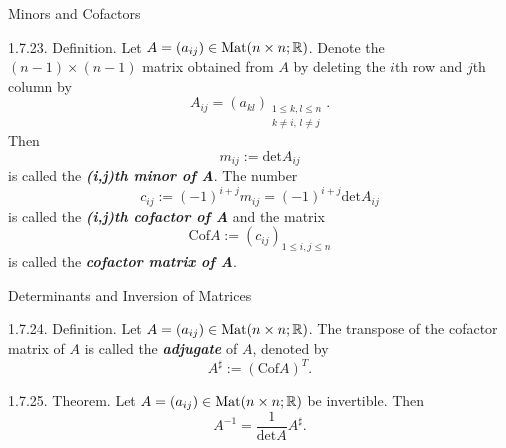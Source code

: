 \documentclass[hyperref={pdfpagelabels=true}]{beamer}
\newcommand{\Mat}{\text{Mat}}
\newcommand{\highlightg}[1]{\textcolor[rgb]{0.1,0.5,0.3}{\emph{\textbf{#1}}}}
\newcommand{\<}{\langle}
\renewcommand{\>}{\rangle}
\begin{document}
        \begin{frame}{Minors and Cofactors}
            \begin{block}{1.7.23. Definition.}
                Let $A = (a_{ij}) \in \Mat(n \times n;\R)$. Denote the $(n-1) \times (n-1)$ matrix obtained from $A$ by deleting the $i$th row and $j$th column by 
                \[A_{ij} = (a_{kl})_{\substack{1 \leq k,l \leq n\\k \neq i,\,l \neq j}}.\]
                Then
                \[m_{ij}:=\text{det}A_{ij}\]
                is called the \highlightg{(i,j)th minor of A}. The number
                \[c_{ij}:=(-1)^{i+j}m_{ij} = (-1)^{i+j}\text{det}A_{ij}\]
                is called the \highlightg{(i,j)th cofactor of A} and the matrix
                \[\text{Cof}A:=(c_{ij})_{1 \leq i,j \leq n}\]
                is called the \highlightg{cofactor matrix of A}.
            \end{block}
        \end{frame}
        \begin{frame}{Determinants and Inversion of Matrices}
            \begin{block}{1.7.24. Definition.}
                Let $A = (a_{ij}) \in \Mat(n \times n;\R)$. The transpose of the cofactor matrix of $A$ is called the \highlightg{adjugate} of $A$, denoted by 
                \[A^{\sharp}:=(\text{Cof}A)^{T}.\]
            \end{block}
            \begin{block}{1.7.25. Theorem.}
                Let $A = (a_{ij}) \in \Mat(n \times n;\R)$ be invertible. Then
                \[A^{-1} = \frac{1}{\text{det}A}A^{\sharp}.\]
            \end{block}
        \end{frame}
\end{document}
